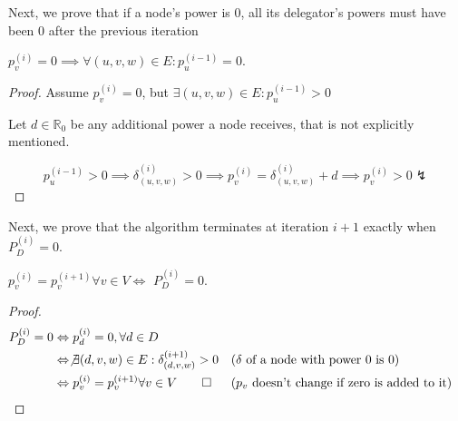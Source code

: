 Next, we prove that if a node's power is 0, all its delegator's powers must have been 0 after the previous iteration
\begin{lemma}\label{lem:simple_iterative_empty_node}
$p_v^{(i)} = 0 \implies \forall (u, v, w) \in E: p_u^{(i - 1)} = 0$. 
\end{lemma}
\begin{proof} Assume $p_v^{(i)} = 0$, but $\exists (u, v, w) \in E: p_u^{(i-1)} > 0$

Let $d \in \mathbb{R}_{0}$ be any additional power a node receives, that is not explicitly mentioned.

\[
p_u^{(i-1)} > 0 \implies \delta_{(u, v, w)}^{(i)} > 0 \implies p_v^{(i)} = \delta_{(u, v, w)}^{(i)} + d \implies p_v^{(i)} > 0 \lightning
\]

\end{proof}

Next, we prove that the algorithm terminates at iteration $i+1$ exactly when $P_D^{(i)} = 0$.

\begin{lemma}\label{lem:simple_alg_terminates}
 $p_v^{(i)} = p_v^{(i+1)} \forall v \in V \Leftrightarrow$ $P_D^{(i)} = 0$.
\end{lemma}
\begin{proof}

\begin{align*}
	P_D^{(i)} = 0 
	&\Leftrightarrow p_d^{(i)} = 0, \forall d \in D \\
	&\Leftrightarrow \not\exists (d, v, w) \in E: \delta_{(d, v, w)}^{(i+1)} > 0  &&\text{($\delta$ of a node with power 0 is 0)}\\
	&\Leftrightarrow p_v^{(i)} = p_v^{(i+1)} \forall v \in V \qed  &&\text{($p_v$ doesn't change if zero is added to it)}
\end{align*}
\end{proof}

